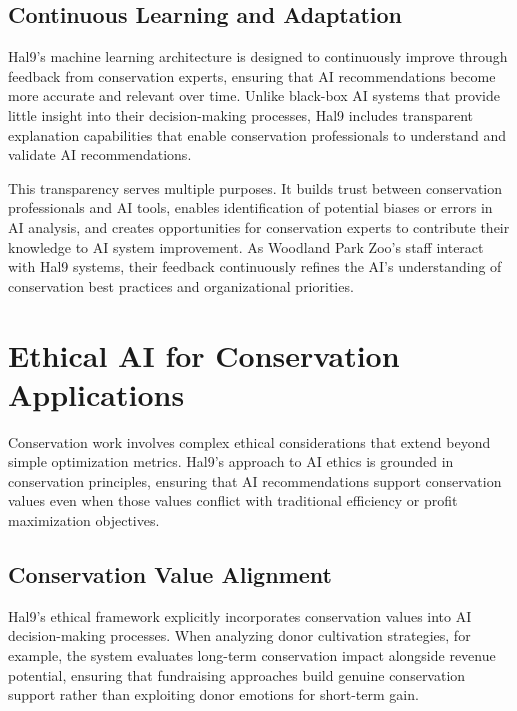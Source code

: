 \documentclass[
  Letterpaper,
]{scrbook}
\begin{document}
\subsection{Continuous Learning and
Adaptation}\label{continuous-learning-and-adaptation}

Hal9's machine learning architecture is designed to continuously improve
through feedback from conservation experts, ensuring that AI
recommendations become more accurate and relevant over time. Unlike
black-box AI systems that provide little insight into their
decision-making processes, Hal9 includes transparent explanation
capabilities that enable conservation professionals to understand and
validate AI recommendations.

This transparency serves multiple purposes. It builds trust between
conservation professionals and AI tools, enables identification of
potential biases or errors in AI analysis, and creates opportunities for
conservation experts to contribute their knowledge to AI system
improvement. As Woodland Park Zoo's staff interact with Hal9 systems,
their feedback continuously refines the AI's understanding of
conservation best practices and organizational priorities.

\section{Ethical AI for Conservation
Applications}\label{ethical-ai-for-conservation-applications}

Conservation work involves complex ethical considerations that extend
beyond simple optimization metrics. Hal9's approach to AI ethics is
grounded in conservation principles, ensuring that AI recommendations
support conservation values even when those values conflict with
traditional efficiency or profit maximization objectives.

\subsection{Conservation Value
Alignment}\label{conservation-value-alignment}

Hal9's ethical framework explicitly incorporates conservation values
into AI decision-making processes. When analyzing donor cultivation
strategies, for example, the system evaluates long-term conservation
impact alongside revenue potential, ensuring that fundraising approaches
build genuine conservation support rather than exploiting donor emotions
for short-term gain.
\end{document}
